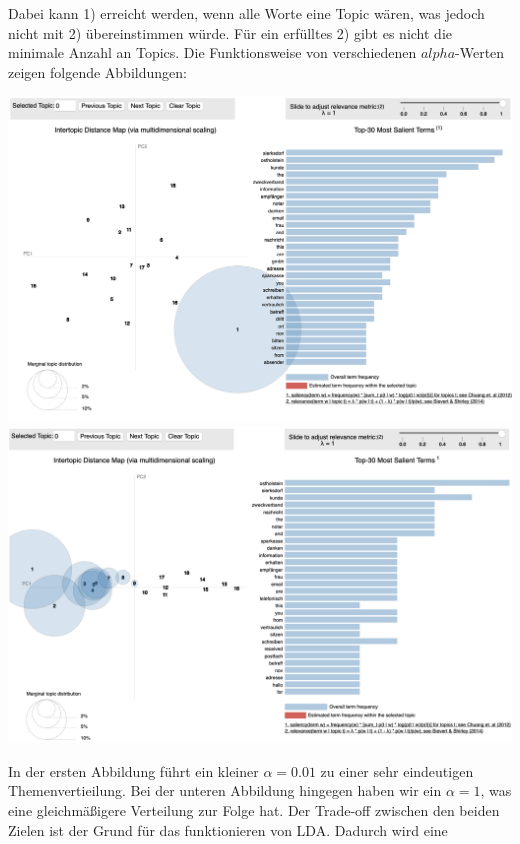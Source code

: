 \documentclass[german,version-2020-11]{uzl-thesis}
\begin{document}
Dabei kann 1) erreicht werden, wenn alle Worte eine Topic wären, was jedoch nicht mit 2) übereinstimmen würde. Für ein erfülltes 2) gibt es nicht die minimale Anzahl an Topics. Die Funktionsweise von verschiedenen $alpha$-Werten zeigen folgende Abbildungen: 
\\
\begin{center}
\includegraphics[scale=0.3]{lda_alpha001.png}\\
\includegraphics[scale=0.3]{lda_alpha1.png}\\
\end{center}
In der ersten Abbildung führt ein kleiner $\alpha = 0.01$ zu einer sehr eindeutigen Themenvertieilung. Bei der unteren Abbildung hingegen haben wir ein $\alpha = 1$, was eine gleichmäßigere Verteilung zur Folge hat. Der Trade-off zwischen den beiden Zielen ist der Grund für das funktionieren von LDA. Dadurch wird eine

\end{document}

